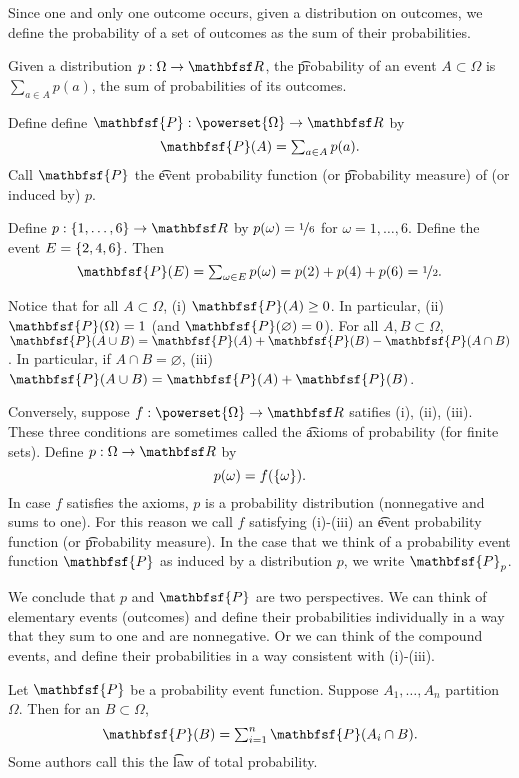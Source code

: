 

Since one and only one outcome occurs, given a distribution on outcomes, we define the probability of a set of outcomes as the sum of their probabilities.


Given a distribution $p: \Omega  \to \R $, the \t{probability of an event} $A \subset \Omega $ is $\sum_{a \in A} p(a)$, the sum of probabilities of its outcomes.

Define define $\mathbfsf{P} : \powerset{\Omega } \to \R $ by
  \[
\textstyle
\mathbfsf{P} (A) = \sum_{a \in A} p(a).
  \]
Call $\mathbfsf{P} $ the \t{event probability function} (or \t{probability measure}) of (or induced by) $p$.

Define $p: \set{1, \dots, 6} \to \R $ by $p(\omega ) = \nicefrac{1}{6}$ for $\omega  = 1, \dots, 6$.
Define the event $E = \{2, 4, 6\}$.
Then
  \[
\textstyle
\mathbfsf{P} (E) = \sum_{\omega  \in E} p(\omega ) = p(2) + p(4) + p(6) = \nicefrac{1}{2}.
  \]

Notice that for all $A \subset \Omega $, (i) $\mathbfsf{P} (A) \geq 0$.
In particular, (ii) $\mathbfsf{P} (\Omega ) = 1$ (and $\mathbfsf{P} (\varnothing) = 0$).
For all $A, B \subset \Omega $, $\mathbfsf{P} (A \cup B) = \mathbfsf{P} (A) + \mathbfsf{P} (B) - \mathbfsf{P} (A \cap B)$.
In particular, if $A \cap B = \varnothing$, (iii) $\mathbfsf{P} (A \cup B) = \mathbfsf{P} (A) + \mathbfsf{P} (B)$.

Conversely, suppose $f: \powerset{\Omega } \to \R $ satifies (i), (ii), (iii).
These three conditions are sometimes called the \t{axioms of probability} (for finite sets).
Define $p: \Omega  \to \R $ by
  \[
p(\omega ) = f(\{\omega \}).
  \]
In case $f$ satisfies the axioms, $p$ is a probability distribution (nonnegative and sums to one).
For this reason we call $f$ satisfying (i)-(iii) an \t{event probability function} (or \t{probability measure}).
In the case that we think of a probability event function $\mathbfsf{P} $ as induced by a distribution $p$, we write $\mathbfsf{P} _p$.

We conclude that $p$ and $\mathbfsf{P} $ are two perspectives.
We can think of elementary events (outcomes) and define their probabilities individually in a way that they sum to one and are nonnegative.
Or we can think of the compound events, and define their probabilities in a way consistent with (i)-(iii).

Let $\mathbfsf{P} $ be a probability event function.
Suppose $A_1, \dots, A_n$ partition $\Omega $.
Then for an $B \subset \Omega $,
  \[
\textstyle
\mathbfsf{P} (B) = \sum_{i = 1}^{n} \mathbfsf{P} (A_i \cap B).
  \]
Some authors call this the \t{law of total probability}.
